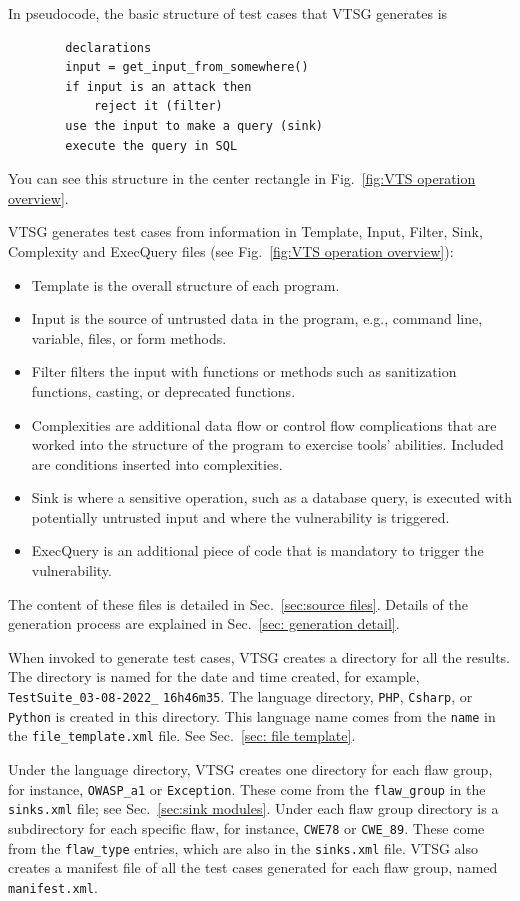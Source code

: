 \documentclass[12pt]{article}
\begin{document}
In pseudocode, the basic structure of test cases that VTSG generates is
\begin{verbatim}
        declarations
        input = get_input_from_somewhere()
        if input is an attack then
            reject it (filter)
        use the input to make a query (sink)
        execute the query in SQL
\end{verbatim}
You can see this structure in the center rectangle in
Fig.~\ref{fig:VTS operation overview}.

VTSG generates test cases from information in Template, Input,
Filter, Sink, Complexity and ExecQuery files 
(see Fig.~\ref{fig:VTS operation overview}):
\begin{itemize}
 \item Template is the overall structure of each program.
 \item Input is the source of untrusted data in the program, e.g., 
 command line, variable, files, or form methods.
 \item Filter filters the input with functions or methods such as sanitization
   functions, casting, or deprecated functions.
 \item Complexities are additional data flow or control flow complications that are
   worked into the structure of the program to exercise tools' abilities.
   Included are conditions inserted into complexities.
 \item Sink is where a sensitive operation, such as a database query, 
 is executed with potentially untrusted input and where the 
 vulnerability is triggered.
 \item ExecQuery is an additional piece of code that is mandatory to 
 trigger the vulnerability.
\end{itemize}
The content of these files is detailed in
Sec.~\ref{sec:source files}.
Details of the generation process are explained in
Sec.~\ref{sec: generation detail}.

\label{sec:case directory structure}
When invoked to generate test cases, VTSG creates a directory for all the results.
The directory is named for the date and time created, for example,
\verb|TestSuite_03-08-2022_| \verb|16h46m35|.
The language directory, \verb|PHP|,
\verb|Csharp|, or \verb|Python| is created in this directory.
This language name comes from the \verb|name|
in the \verb|file_template.xml| file.  See Sec.~\ref{sec: file template}.

Under the language directory, VTSG creates one directory for each flaw group, for
instance, \verb|OWASP_a1| or \verb|Exception|.  These come from the \verb|flaw_group|
in the \verb|sinks.xml| file; see Sec.~\ref{sec:sink modules}.
Under each flaw group directory is a subdirectory for each specific flaw, for
instance, \verb|CWE78| or \verb|CWE_89|.  These come from the \verb|flaw_type|
entries, which are also in the \verb|sinks.xml| file.
VTSG also creates a manifest file of all the test cases generated for each flaw
group, named
\verb|manifest.xml|.
\end{document}
